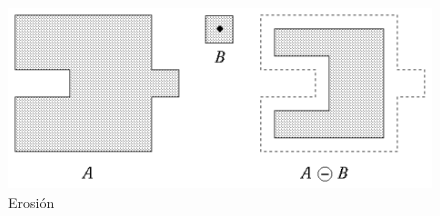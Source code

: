 \begin{figure}[hbtp]
\centering
\includegraphics[scale=0.5]{imagenes/erosion.png}
\caption{Erosión}
\label{fig:erosion}
\end{figure}


